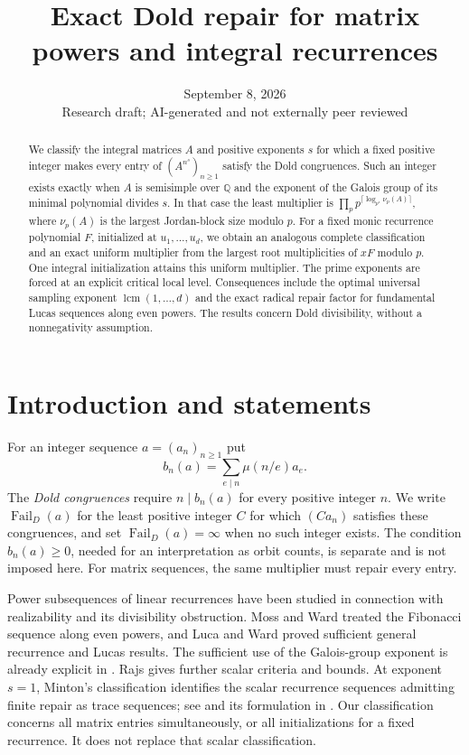 \documentclass[11pt]{article}
\title{Exact Dold repair for matrix powers and integral recurrences}
\author{}
\date{September 8, 2026\\\small Research draft; AI-generated and not externally peer reviewed}
\theoremstyle{remark}
\newcommand{\Fail}{\operatorname{Fail}_{D}}
\newcommand{\lcm}{\operatorname{lcm}}
\newcommand{\Q}{\mathbb Q}
\begin{document}
\maketitle
\begin{abstract}
We classify the integral matrices $A$ and positive exponents $s$ for which a fixed positive integer makes every entry of $(A^{n^s})_{n\geq1}$ satisfy the Dold congruences. Such an integer exists exactly when $A$ is semisimple over $\Q$ and the exponent of the Galois group of its minimal polynomial divides $s$. In that case the least multiplier is $\prod_p p^{\lceil\log_{p^s}\nu_p(A)\rceil}$, where $\nu_p(A)$ is the largest Jordan-block size modulo $p$. For a fixed monic recurrence polynomial $F$, initialized at $u_1,\ldots,u_d$, we obtain an analogous complete classification and an exact uniform multiplier from the largest root multiplicities of $xF$ modulo $p$. One integral initialization attains this uniform multiplier. The prime exponents are forced at an explicit critical local level. Consequences include the optimal universal sampling exponent $\lcm(1,\ldots,d)$ and the exact radical repair factor for fundamental Lucas sequences along even powers. The results concern Dold divisibility, without a nonnegativity assumption.
\end{abstract}

\section{Introduction and statements}
For an integer sequence $a=(a_n)_{n\geq1}$ put
\[
 b_n(a)=\sum_{e\mid n}\mu(n/e)a_e.
\]
The \emph{Dold congruences} require $n\mid b_n(a)$ for every positive integer $n$.
We write $\Fail(a)$ for the least positive integer $C$ for which $(Ca_n)$ satisfies these congruences, and set $\Fail(a)=\infty$ when no such integer exists. The condition $b_n(a)\geq0$, needed for an interpretation as orbit counts, is separate and is not imposed here. For matrix sequences, the same multiplier must repair every entry.

Power subsequences of linear recurrences have been studied in connection with realizability and its divisibility obstruction. Moss and Ward \cite{MW} treated the Fibonacci sequence along even powers, and Luca and Ward \cite{LW} proved sufficient general recurrence and Lucas results. The sufficient use of the Galois-group exponent is already explicit in \cite[Theorem~1]{LW}. Rajs \cite{Rajs} gives further scalar criteria and bounds. At exponent $s=1$, Minton's classification identifies the scalar recurrence sequences admitting finite repair as trace sequences; see \cite[Theorem~2.15 and Remark~2.16]{Minton} and its formulation in \cite[Theorem~2.4]{BGW}. Our classification concerns all matrix entries simultaneously, or all initializations for a fixed recurrence. It does not replace that scalar classification.
\end{document}
